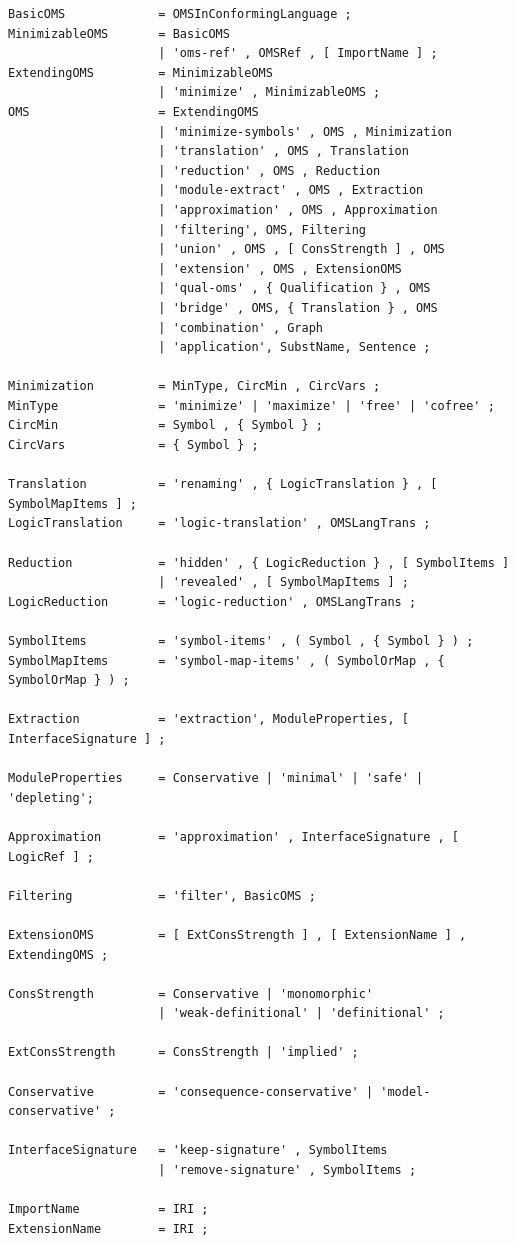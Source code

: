 \documentclass[10pt,%
\ifpretendfinal
final%
\else
draft%
\fi,
]{scrreprt}
\begin{document}
\begin{lstlisting}[language=ebnf,escapeinside={<>}]  % abstract syntax
BasicOMS             = OMSInConformingLanguage ;
MinimizableOMS       = BasicOMS
                     | 'oms-ref' , OMSRef , [ ImportName ] ;
ExtendingOMS         = MinimizableOMS
                     | 'minimize' , MinimizableOMS ;
OMS                  = ExtendingOMS
                     | 'minimize-symbols' , OMS , Minimization
                     | 'translation' , OMS , Translation
                     | 'reduction' , OMS , Reduction
                     | 'module-extract' , OMS , Extraction 
                     | 'approximation' , OMS , Approximation
                     | 'filtering', OMS, Filtering
                     | 'union' , OMS , [ ConsStrength ] , OMS 
                     | 'extension' , OMS , ExtensionOMS
                     | 'qual-oms' , { Qualification } , OMS
                     | 'bridge' , OMS, { Translation } , OMS
                     | 'combination' , Graph
                     | 'application', SubstName, Sentence ;

Minimization         = MinType, CircMin , CircVars ;
MinType              = 'minimize' | 'maximize' | 'free' | 'cofree' ;
CircMin              = Symbol , { Symbol } ;
CircVars             = { Symbol } ;

Translation          = 'renaming' , { LogicTranslation } , [ SymbolMapItems ] ;
LogicTranslation     = 'logic-translation' , OMSLangTrans ;

Reduction            = 'hidden' , { LogicReduction } , [ SymbolItems ]
                     | 'revealed' , [ SymbolMapItems ] ;
LogicReduction       = 'logic-reduction' , OMSLangTrans ;

SymbolItems          = 'symbol-items' , ( Symbol , { Symbol } ) ;
SymbolMapItems       = 'symbol-map-items' , ( SymbolOrMap , { SymbolOrMap } ) ;

Extraction           = 'extraction', ModuleProperties, [ InterfaceSignature ] ;

ModuleProperties     = Conservative | 'minimal' | 'safe' | 'depleting'; 

Approximation        = 'approximation' , InterfaceSignature , [ LogicRef ] ;

Filtering            = 'filter', BasicOMS ;

ExtensionOMS         = [ ExtConsStrength ] , [ ExtensionName ] , ExtendingOMS ;

ConsStrength         = Conservative | 'monomorphic'
                     | 'weak-definitional' | 'definitional' ;

ExtConsStrength      = ConsStrength | 'implied' ;

Conservative         = 'consequence-conservative' | 'model-conservative' ;

InterfaceSignature   = 'keep-signature' , SymbolItems 
                     | 'remove-signature' , SymbolItems ;

ImportName           = IRI ;
ExtensionName        = IRI ;
\end{lstlisting}
\end{document}
